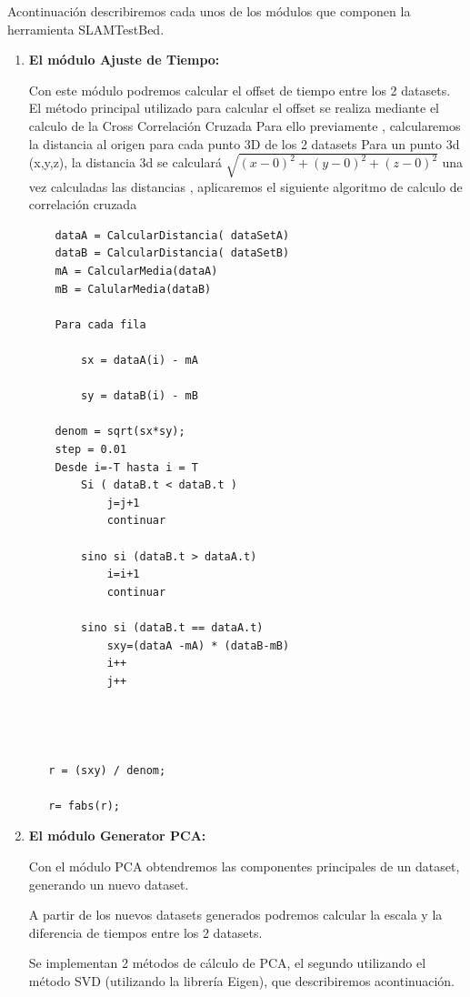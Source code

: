 Acontinuación describiremos cada unos de los módulos que componen la herramienta SLAMTestBed.
\begin{enumerate}%


\item \textbf{El módulo Ajuste de Tiempo:}

	Con este módulo podremos calcular el offset de tiempo entre los 2 datasets.
	El método principal utilizado para calcular el offset se realiza mediante el calculo de la Cross Correlación Cruzada
	Para ello previamente , calcularemos la distancia al origen para cada punto 3D de los 2 datasets
	Para un punto 3d (x,y,z), la distancia 3d se calculará 
	\begin{math}
	\sqrt{(x-0)^2 +(y-0)^2+(z-0)^2}
	\end{math}
	una vez calculadas las distancias , aplicaremos el siguiente algoritmo de calculo de correlación cruzada
	                                
	\begin{lstlisting}
	dataA = CalcularDistancia( dataSetA)
	dataB = CalcularDistancia( dataSetB)
	mA = CalcularMedia(dataA)
	mB = CalularMedia(dataB)

	Para cada fila

   		sx = dataA(i) - mA

   		sy = dataB(i) - mB

   	denom = sqrt(sx*sy);
   	step = 0.01
   	Desde i=-T hasta i = T
   		Si ( dataB.t < dataB.t )
			j=j+1
    		continuar

    	sino si (dataB.t > dataA.t)
    		i=i+1
    		continuar

    	sino si (dataB.t == dataA.t)
    		sxy=(dataA -mA) * (dataB-mB)
        	i++
        	j++


   

   r = (sxy) / denom;

   r= fabs(r);
    \end{lstlisting}
	   	
	

\item \textbf{El módulo Generator PCA:}

	Con el módulo PCA obtendremos las componentes principales de un dataset, generando un nuevo dataset.

	A partir de los nuevos datasets generados podremos calcular la escala y la diferencia de tiempos entre los 2 datasets.

	Se implementan 2 métodos de cálculo de PCA, el segundo utilizando el método SVD (utilizando la librería Eigen), que describiremos acontinuación.


\end{enumerate}
